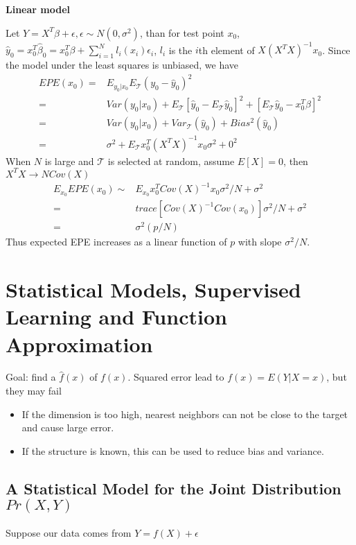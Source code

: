 \textbf{Linear model}

Let $Y=X^T\beta+\epsilon,\epsilon\sim N(0,\sigma^2)$, than for test point $x_0$,  $\hat{y}_0=x_0^T\hat{\beta}_0=x_0^T\beta+\sum_{i=1}^Nl_i(x_i)\epsilon_i$, $l_i$ is the $i$th element of $X(X^TX)^{-1}x_0$. Since the model under the least squares is unbiased, we have
\begin{align*}
	EPE(x_0)=&E_{y_0|x_0}E_{\mathcal{T}}(y_0-\hat{y}_0)^2\\
	=&Var(y_0|x_0)+E_{\mathcal{T}}[\hat{y}_0-E_{\mathcal{T}}\hat{y}_0]^2+[E_{\mathcal{T}}\hat{y}_0-x_0^T\beta]^2\\
	=&Var(y_0|x_0)+Var_{\mathcal{T}}(\hat{y}_0)+Bias^2(\hat{y}_0)\\
	=&\sigma^2+E_{\mathcal{T}}x_0^T(X^TX)^{-1}x_0\sigma^2+0^2
\end{align*}
When $N$ is large and $\mathcal{T}$ is selected at random, assume $E[X]=0$, then $X^TX\rightarrow NCov(X)$
\begin{align*}
	E_{x_0}EPE(x_0)\sim&E_{x_0}x_0^TCov(X)^{-1}x_0\sigma^2/N+\sigma^2\\
	=&trace[Cov(X)^{-1}Cov(x_0)]\sigma^2/N+\sigma^2\\
	=&\sigma^2(p/N)
\end{align*}
Thus expected EPE increases as a linear function of $p$ with slope $\sigma^2/N$. 

\section{Statistical Models, Supervised Learning and Function Approximation} 
Goal: find a $\hat{f}(x)$ of $f(x)$. Squared error lead to $f(x)=E(Y|X=x)$, but they may fail
\begin{itemize}
	\item If the dimension is too high, nearest neighbors can not be close to the target and cause large error. 
	\item If the structure is known, this can be used to reduce bias and variance. 
\end{itemize}
\subsection{A Statistical Model for the Joint Distribution $Pr(X,Y)$}
Suppose our data comes from $Y=f(X)+\epsilon$







